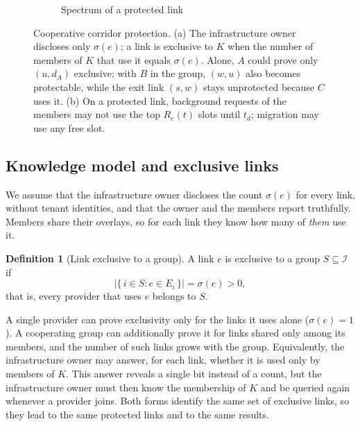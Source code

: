\documentclass[11pt,a4paper]{article}
\theoremstyle{definition}
\newtheorem{definition}{Definition}
\begin{document}
\begin{figure}[!t]
\begin{subfigure}[b]{0.38\textwidth}
\caption{Spectrum of a protected link}
\end{subfigure}
\caption{Cooperative corridor protection. (a) The infrastructure owner discloses only $\sigma(e)$; a link is exclusive to $K$ when the number of members of $K$ that use it equals $\sigma(e)$. Alone, $A$ could prove only $(u,d_A)$ exclusive; with $B$ in the group, $(w,u)$ also becomes protectable, while the exit link $(s,w)$ stays unprotected because $C$ uses it. (b) On a protected link, background requests of the members may not use the top $R_e(t)$ slots until $t_d$; migration may use any free slot.}
\label{fig:mechanism}
\end{figure}

\subsection{Knowledge model and exclusive links}

We assume that the infrastructure owner discloses the count $\sigma(e)$ for every link, without tenant identities, and that the owner and the members report truthfully.
Members share their overlays, so for each link they know how many of \emph{them} use it.

\begin{definition}[Link exclusive to a group]
A link $e$ is exclusive to a group $S\subseteq\mathcal{I}$ if
\begin{equation}
  \bigl|\{\,i\in S : e\in E_i\,\}\bigr| = \sigma(e) > 0 ,
\end{equation}
that is, every provider that uses $e$ belongs to $S$.
\end{definition}

A single provider can prove exclusivity only for the links it uses alone ($\sigma(e)=1$).
A cooperating group can additionally prove it for links shared only among its members, and the number of such links grows with the group.
Equivalently, the infrastructure owner may answer, for each link, whether it is used only by members of $K$.
This answer reveals a single bit instead of a count, but the infrastructure owner must then know the membership of $K$ and be queried again whenever a provider joins.
Both forms identify the same set of exclusive links, so they lead to the same protected links and to the same results.
\end{document}
